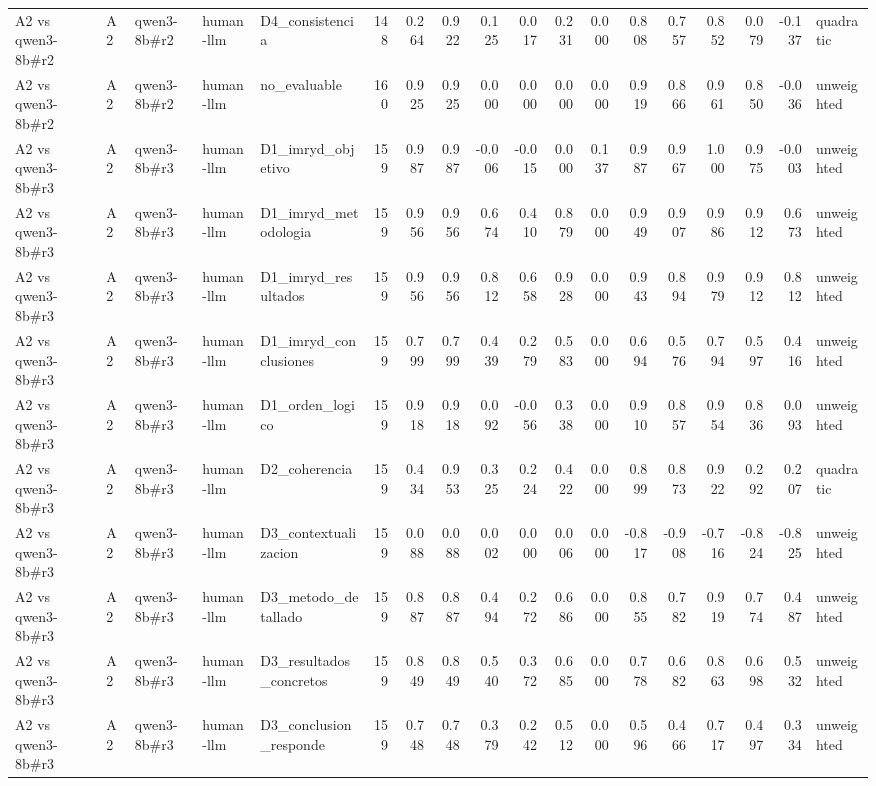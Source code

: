 \begin{table}
{\begin{tabular}{lllllrrrrrrrrrrrrl}
A2 vs qwen3-8b\#r2 & A2 & qwen3-8b\#r2 & human-llm & D4\_consistencia & 148 & 0.264 & 0.922 & 0.125 & 0.017 & 0.231 & 0.000 & 0.808 & 0.757 & 0.852 & 0.079 & -0.137 & quadratic \\
A2 vs qwen3-8b\#r2 & A2 & qwen3-8b\#r2 & human-llm & no\_evaluable & 160 & 0.925 & 0.925 & 0.000 & 0.000 & 0.000 & 0.000 & 0.919 & 0.866 & 0.961 & 0.850 & -0.036 & unweighted \\
A2 vs qwen3-8b\#r3 & A2 & qwen3-8b\#r3 & human-llm & D1\_imryd\_objetivo & 159 & 0.987 & 0.987 & -0.006 & -0.015 & 0.000 & 0.137 & 0.987 & 0.967 & 1.000 & 0.975 & -0.003 & unweighted \\
A2 vs qwen3-8b\#r3 & A2 & qwen3-8b\#r3 & human-llm & D1\_imryd\_metodologia & 159 & 0.956 & 0.956 & 0.674 & 0.410 & 0.879 & 0.000 & 0.949 & 0.907 & 0.986 & 0.912 & 0.673 & unweighted \\
A2 vs qwen3-8b\#r3 & A2 & qwen3-8b\#r3 & human-llm & D1\_imryd\_resultados & 159 & 0.956 & 0.956 & 0.812 & 0.658 & 0.928 & 0.000 & 0.943 & 0.894 & 0.979 & 0.912 & 0.812 & unweighted \\
A2 vs qwen3-8b\#r3 & A2 & qwen3-8b\#r3 & human-llm & D1\_imryd\_conclusiones & 159 & 0.799 & 0.799 & 0.439 & 0.279 & 0.583 & 0.000 & 0.694 & 0.576 & 0.794 & 0.597 & 0.416 & unweighted \\
A2 vs qwen3-8b\#r3 & A2 & qwen3-8b\#r3 & human-llm & D1\_orden\_logico & 159 & 0.918 & 0.918 & 0.092 & -0.056 & 0.338 & 0.000 & 0.910 & 0.857 & 0.954 & 0.836 & 0.093 & unweighted \\
A2 vs qwen3-8b\#r3 & A2 & qwen3-8b\#r3 & human-llm & D2\_coherencia & 159 & 0.434 & 0.953 & 0.325 & 0.224 & 0.422 & 0.000 & 0.899 & 0.873 & 0.922 & 0.292 & 0.207 & quadratic \\
A2 vs qwen3-8b\#r3 & A2 & qwen3-8b\#r3 & human-llm & D3\_contextualizacion & 159 & 0.088 & 0.088 & 0.002 & 0.000 & 0.006 & 0.000 & -0.817 & -0.908 & -0.716 & -0.824 & -0.825 & unweighted \\
A2 vs qwen3-8b\#r3 & A2 & qwen3-8b\#r3 & human-llm & D3\_metodo\_detallado & 159 & 0.887 & 0.887 & 0.494 & 0.272 & 0.686 & 0.000 & 0.855 & 0.782 & 0.919 & 0.774 & 0.487 & unweighted \\
A2 vs qwen3-8b\#r3 & A2 & qwen3-8b\#r3 & human-llm & D3\_resultados\_concretos & 159 & 0.849 & 0.849 & 0.540 & 0.372 & 0.685 & 0.000 & 0.778 & 0.682 & 0.863 & 0.698 & 0.532 & unweighted \\
A2 vs qwen3-8b\#r3 & A2 & qwen3-8b\#r3 & human-llm & D3\_conclusion\_responde & 159 & 0.748 & 0.748 & 0.379 & 0.242 & 0.512 & 0.000 & 0.596 & 0.466 & 0.717 & 0.497 & 0.334 & unweighted \\

\end{tabular}}
\end{table}
